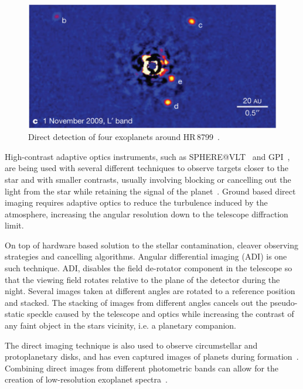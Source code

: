 \begin{figure}
    \centering
    \includegraphics[width=0.5\linewidth]{./figures/introduction/DirectImaging_HR8799_MaroisEtAl2010}
    \caption[Direct detection of four exoplanets around HR\,8799.]{Direct detection of four exoplanets around HR\,8799~\citep{marois_images_2010}.}
    \label{fig:directimaging}
\end{figure}

High-contrast adaptive optics instruments, such as SPHERE@VLT~\citep{beuzit_sphere_2008} and GPI~\citep{macintosh_gemini_2008}, are being used with several different techniques to observe targets closer to the star and with smaller contrasts, usually involving blocking or cancelling out the light from the star while retaining the signal of the planet~\citep[e.g.][]{marois_direct_2005, mawet_annular_2005, schmid_zimpol_2005, sirbu_prospects_2017, sirbu_techniques_2017, wang_observing_2017}.
Ground based direct imaging requires adaptive optics to reduce the turbulence induced by the atmosphere, increasing the angular resolution down to the telescope diffraction limit.

On top of hardware based solution to the stellar contamination, cleaver observing strategies and cancelling algorithms.
Angular differential imaging (ADI) \citep[eg.][]{marois_direct_2005} is one such technique.
ADI, disables the field de-rotator component in the telescope so that the viewing field rotates relative to the plane of the detector during the night.
Several images taken at different angles are rotated to a reference position and stacked.
The stacking of images from different angles cancels out the pseudo-static speckle caused by the telescope and optics while increasing the contrast of any faint object in the stars vicinity, i.e. a planetary companion.

The direct imaging technique is also used to observe circumstellar and protoplanetary disks, and has even captured images of planets during formation~\citep[e.g.][]{sallum_accreting_2015}.
Combining direct images from different photometric bands can allow for the creation of low-resolution exoplanet spectra~\citep[e.g.][]{kuzuhara_direct_2013, zurlo_new_2015}.


